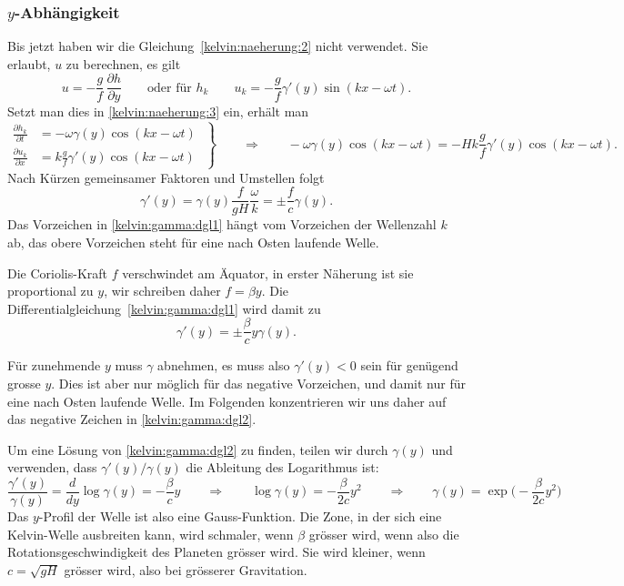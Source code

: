 \subsubsection{$y$-Abhängigkeit}
Bis jetzt haben wir die Gleichung~\eqref{kelvin:naeherung:2} nicht
verwendet.
Sie erlaubt, $u$ zu berechnen, es gilt
\[
u=-\frac{g}{f}\,\frac{\partial h}{\partial y}
\qquad
\text{oder für $h_k$}
\qquad
u_k=-\frac{g}{f} \gamma'(y) \sin(kx-\omega t).
\]
Setzt man dies in \eqref{kelvin:naeherung:3} ein, erhält man
\begin{equation}
\left.
\begin{aligned}
\frac{\partial h_k}{\partial t}
&=
-\omega
\gamma(y) \cos(kx-\omega t)
\\
\frac{\partial u_k}{\partial x}
&=
k \frac{g}{f}\gamma'(y) \cos(kx-\omega t)
\end{aligned}
\;\right\}
\qquad\Rightarrow\qquad
-\omega
\gamma(y) \cos(kx-\omega t)
=
-H
k \frac{g}{f}\gamma'(y) \cos(kx-\omega t).
\end{equation}
Nach Kürzen gemeinsamer Faktoren und Umstellen folgt
\begin{equation}
\gamma'(y)
=
\gamma(y) \frac{f}{gH}\frac{\omega}{k}
=
\pm
\frac{f}{c} \gamma(y).
\label{kelvin:gamma:dgl1}
\end{equation}
Das Vorzeichen in \eqref{kelvin:gamma:dgl1} hängt vom Vorzeichen der
Wellenzahl $k$ ab, das obere Vorzeichen steht für eine nach Osten
laufende Welle.

Die Coriolis-Kraft $f$ verschwindet am Äquator, in erster Näherung
ist sie proportional zu $y$, wir schreiben daher $f=\beta y$.
Die Differentialgleichung~\eqref{kelvin:gamma:dgl1} wird damit zu
\begin{equation}
\gamma'(y)
=
\pm
\frac{\beta}{c} 
y\gamma(y).
\label{kelvin:gamma:dgl2}
\end{equation}

Für zunehmende $y$ muss $\gamma$ abnehmen, es muss also $\gamma'(y)<0$ sein
für genügend grosse $y$.
Dies ist aber nur möglich für das negative Vorzeichen, und damit nur
für eine nach Osten laufende Welle.
Im Folgenden konzentrieren wir uns daher auf das negative Zeichen
in \eqref{kelvin:gamma:dgl2}.

Um eine Lösung von \eqref{kelvin:gamma:dgl2} zu finden, teilen wir
durch $\gamma(y)$
und verwenden, dass $\gamma'(y)/\gamma(y)$ die Ableitung des
Logarithmus ist:
\begin{equation}
\frac{\gamma'(y)}{\gamma(y)}
=
\frac{d}{dy}\log \gamma(y) = -\frac{\beta}{c} y
\qquad\Rightarrow\qquad
\log\gamma(y) = -\frac{\beta}{2c}y^2
\qquad\Rightarrow\qquad
\gamma(y) = \exp\biggl(
- \frac{\beta}{2c}y^2
\biggr)
\end{equation}
Das $y$-Profil der Welle ist also eine Gauss-Funktion.
Die Zone, in der sich eine Kelvin-Welle ausbreiten kann, 
wird schmaler, wenn $\beta$ grösser wird, wenn also die 
Rotationsgeschwindigkeit des Planeten grösser wird.
Sie wird kleiner, wenn $c=\sqrt{gH}$ grösser wird, also
bei grösserer Gravitation.

